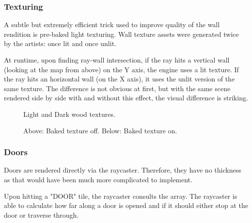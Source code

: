 \subsubsection{Texturing}
A subtle but extremely efficient trick used to improve quality of the wall rendition is pre-baked light texturing. Wall texture assets were generated twice by the artists: once lit and once unlit.\\
\par
At runtime, upon finding ray-wall intersection, if the ray hits a vertical wall (looking at the map from above) on the Y axis, the engine uses a lit texture. If the ray hits an horizontal wall (on the X axis), it uses the unlit version of the same texture. The difference is not obvious at first, but with the same scene rendered side by side with and without this effect, the visual difference is striking.\\
\par
  \begin{figure}[H]
\centering
 \caption{Light and Dark wood textures.}
 \end{figure}
\par

\begin{minipage}{\textwidth}
\begin{figure}[H]
\centering
 \caption{Above: Baked texture off. Below: Baked texture on.}
 \end{figure}

\begin{figure}[H]
\centering
 
 \end{figure}
 \end{minipage}

 





\subsubsection{Doors}
Doors are rendered directly via the raycaster. Therefore, they have no thickness as that would have been much more complicated to implement.\\
\par
\begin{figure}[H]
 \centering
\end{figure}

\par
Upon hitting a "DOOR" tile, the raycaster consults the  array. The raycaster is able to calculate how far along a door is opened and if it should either stop at the door or traverse through.\\

